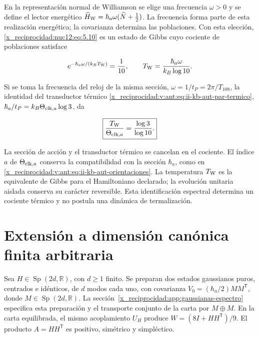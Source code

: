 En la representación normal de Williamson se elige una frecuencia \(\omega>0\) y se define el lector energético
\(\widehat H_{\rm W}=\hbar_a\omega(\widehat N+\tfrac12)\). La frecuencia forma parte de esta realización energética; la covarianza determina las poblaciones. Con esta elección, \eqref{x_reciprocidad:nuc12:eq:5.10} es un estado de Gibbs cuyo cociente de poblaciones satisface



\[
e^{-\hbar_a\omega/(k_BT_{\rm W})}=\frac1{10},\qquad
T_{\rm W}=\frac{\hbar_a\omega}{k_B\log10}.
\]



Si se toma la frecuencia del reloj de la misma sección, \(\omega=1/t_P=2\pi/T_{108}\), la identidad del transductor térmico \eqref{x_reciprocidad:v:ant:eq:ii-kb-aut-par-termico},
\(\hbar_a/t_P=k_B\Theta_{{\rm clk},a}\log3\), da



\begin{equation}
\boxed{\frac{T_{\rm W}}{\Theta_{{\rm clk},a}}=\frac{\log3}{\log10}.}
\label{x_reciprocidad:nuc12:eq:5.11}
\end{equation}



La sección de acción y el transductor térmico se cancelan en el cociente. El índice \(a\) de \(\Theta_{{\rm clk},a}\) conserva la compatibilidad con la sección \(\hbar_a\), como en \eqref{x_reciprocidad:v:ant:eq:ii-kb-aut-orientaciones}. La temperatura \(T_{\rm W}\) es la equivalente de Gibbs para el Hamiltoniano declarado; la evolución unitaria aislada conserva su carácter reversible. Esta identificación espectral determina un cociente térmico y no postula una dinámica de termalización.

\section{Extensión a dimensión canónica finita arbitraria}

Sea \(H\in\operatorname{Sp}(2d,\mathbb R)\), con \(d\geq1\) finito. Se preparan dos estados gaussianos puros, centrados e idénticos, de \(d\) modos cada uno, con covarianza \(V_0=(\hbar_a/2)MM^{\mathsf T}\), donde \(M\in\operatorname{Sp}(2d,\mathbb R)\). La sección~\ref{x_reciprocidad:app:gaussianas-espectro} especifica esta preparación y el transporte conjunto de la carta por \(M\oplus M\). En la carta equilibrada, el mismo acoplamiento \(U_H\) produce \(W=(8I+HH^{\mathsf T})/9\). El producto \(A=HH^{\mathsf T}\) es positivo, simétrico y simpléctico.

